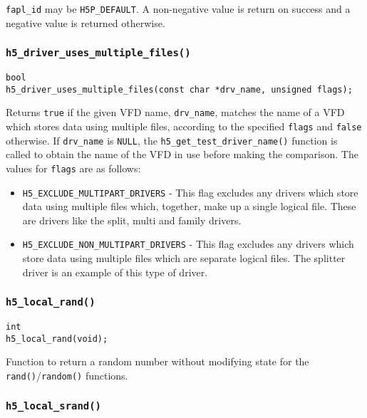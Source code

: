 \documentclass[../HDF5_RFC.tex]{subfiles}
\begin{document}
\texttt{fapl\_id} may be \texttt{H5P\_DEFAULT}. A non-negative value is return on success and a negative
value is returned otherwise.

\subsubsection{\texttt{h5\_driver\_uses\_multiple\_files()}}

\begin{verbatim}
bool
h5_driver_uses_multiple_files(const char *drv_name, unsigned flags);
\end{verbatim}

Returns \texttt{true} if the given VFD name, \texttt{drv\_name}, matches the name of a VFD which
stores data using multiple files, according to the specified \texttt{flags} and \texttt{false} otherwise.
If \texttt{drv\_name} is \texttt{NULL}, the \texttt{h5\_get\_test\_driver\_name()} function is called to
obtain the name of the VFD in use before making the comparison. The values for \texttt{flags} are as
follows:

\begin{itemize}

    \item \texttt{H5\_EXCLUDE\_MULTIPART\_DRIVERS} - This flag excludes any drivers which store data
          using multiple files which, together, make up a single logical file. These are drivers like
          the split, multi and family drivers.
    \item \texttt{H5\_EXCLUDE\_NON\_MULTIPART\_DRIVERS} - This flag excludes any drivers which store
          data using multiple files which are separate logical files. The splitter driver is an example
          of this type of driver.

\end{itemize}

\subsubsection{\texttt{h5\_local\_rand()}}

\begin{verbatim}
int
h5_local_rand(void);
\end{verbatim}

Function to return a random number without modifying state for the \texttt{rand()}/\texttt{random()}
functions.

\subsubsection{\texttt{h5\_local\_srand()}}
\end{document}
